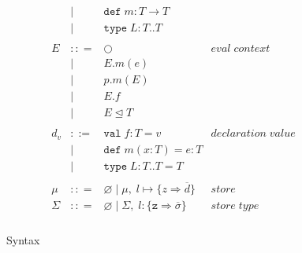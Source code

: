 \documentclass{llncs}
\numberwithin{subcase}{case}
\numberwithin{case}{theorem}
\numberwithin{case}{lemma}
\begin{document}
\begin{figure}[h]
\[\begin{array}{lll}
\begin{array}{lllr}
       & |   & \texttt{def} \; m:T \rightarrow T \\
		 & |   & \texttt{type} \; L : T .. T &\\
&&\\
E & :: = & \bigcirc & eval \; context\\
       & | & E.m(e)\\
       & | & p.m(E)\\
       & | & E.f\\
       & | & E \unlhd T\\
&&\\
d_v & ::= & \texttt{val} \; f : T = v & declaration \; value \\
  & |   & \texttt{def} \; m(x:T) = e : T &\\
  & |   & \texttt{type} \; L : T .. T = T &\\
&&\\
\mu & :: = & \varnothing \; | \; \mu,\; l \mapsto \{z \Rightarrow \overline{d}\} & store \\
\Sigma & :: = & \varnothing \; | \; \Sigma,\; l : \{\texttt{z} \Rightarrow \overline{\sigma}\} & store \; type \\
\end{array}
\end{array}
\]
\caption{Syntax}
\label{f:syntax}
\end{figure}
\end{document}
